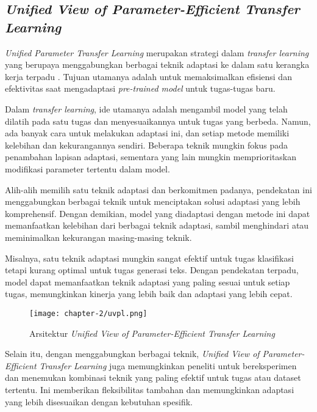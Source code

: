 \subsection{\textit{Unified View of Parameter-Efficient Transfer Learning}}

\textit{Unified Parameter Transfer Learning} merupakan strategi dalam \textit{transfer learning} yang berupaya menggabungkan berbagai teknik adaptasi ke dalam satu kerangka kerja terpadu \parencite{uvpl}. Tujuan utamanya adalah untuk memaksimalkan efisiensi dan efektivitas saat mengadaptasi \textit{pre-trained model} untuk tugas-tugas baru.

Dalam \textit{transfer learning}, ide utamanya adalah mengambil model yang telah dilatih pada satu tugas dan menyesuaikannya untuk tugas yang berbeda. Namun, ada banyak cara untuk melakukan adaptasi ini, dan setiap metode memiliki kelebihan dan kekurangannya sendiri. Beberapa teknik mungkin fokus pada penambahan lapisan adaptasi, sementara yang lain mungkin memprioritaskan modifikasi parameter tertentu dalam model.

Alih-alih memilih satu teknik adaptasi dan berkomitmen padanya, pendekatan ini menggabungkan berbagai teknik untuk menciptakan solusi adaptasi yang lebih komprehensif. Dengan demikian, model yang diadaptasi dengan metode ini dapat memanfaatkan kelebihan dari berbagai teknik adaptasi, sambil menghindari atau meminimalkan kekurangan masing-masing teknik.

Misalnya, satu teknik adaptasi mungkin sangat efektif untuk tugas klasifikasi tetapi kurang optimal untuk tugas generasi teks. Dengan pendekatan terpadu, model dapat memanfaatkan teknik adaptasi yang paling sesuai untuk setiap tugas, memungkinkan kinerja yang lebih baik dan adaptasi yang lebih cepat.

\begin{figure}[ht]
    \centering
    \texttt{[image: chapter-2/uvpl.png]}
    \caption{Arsitektur \textit{Unified View of Parameter-Efficient Transfer Learning} \parencite{uvpl}}
    \label{fig:uvpl}
\end{figure}

Selain itu, dengan menggabungkan berbagai teknik, \textit{Unified View of Parameter-Efficient Transfer Learning} juga memungkinkan peneliti untuk bereksperimen dan menemukan kombinasi teknik yang paling efektif untuk tugas atau dataset tertentu. Ini memberikan fleksibilitas tambahan dan memungkinkan adaptasi yang lebih disesuaikan dengan kebutuhan spesifik.
